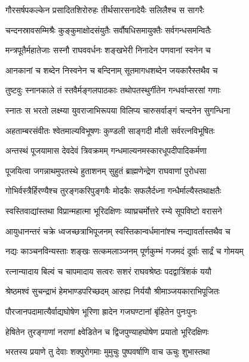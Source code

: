\twolineshloka
{गौरसर्षपकल्केन प्रसादितशिरोरुहः}
{तीर्थसारसनादेयैः सलिलैश्च स सागरैः}%

\twolineshloka
{चन्दनस्रावसम्मिश्रैः कुङ्कुमाक्षोदसंयुतैः}
{सर्वौषधिसमायुक्तैः सर्वगन्धसमन्वितैः}%

\twolineshloka
{मन्त्रपूतैर्महातेजाः सस्नौ राघववर्धनः}
{शङ्खभेरी निनादेन पणवानां स्वनेन च}%

\twolineshloka
{आनकानां च शब्देन निस्वनेन च बन्दिनाम्}
{सूतमागधशब्देन जयकारैस्तथैव च}%

\twolineshloka
{तुष्टवुः स्नानकाले तं स्तवैर्मङ्गलपाठकाः}
{तथोपतस्थुर्गीतेन गन्धर्वाप्सरसां गणाः}%

\twolineshloka
{स्नातः स भरतो लक्ष्म्या युवराजाभिरूपया}
{विलिप्य चारुसर्वाङ्गं चन्दनेन सुगन्धिना}%

\twolineshloka
{अहताम्बरसंवीतः श्वेतमाल्यविभूषणः}
{कुण्डली साङ्गदी मौली सर्वरत्नविभूषितः}%

\twolineshloka
{अन्तस्थं पूजयामास देवदेवं त्रिवक्रमम्}
{गन्धमाल्यनमस्कारधूपदीपादिकर्मणा} %

\twolineshloka
{पूजयित्वा जगन्नाथमुपतस्थे हुताशनम्}
{सुहुतं ब्राह्मणेन्द्रेण राघवाणां पुरोधसा}%

\twolineshloka
{गोभिर्वस्त्रैर्हिरण्यैश्च तुरङ्गकरिपुङ्गवैः}
{मोदकैः सफलैर्दध्ना गन्धैर्माल्यैस्तथाक्षतैः}%

\twolineshloka
{स्वस्तिवाद्यांस्तथा विप्रान्महात्मा भूरिदक्षिणः}
{व्याघ्रचर्मोत्तरे रम्ये सूपविष्टो वरासने}%

\twolineshloka
{आयुधानन्तरं चक्रे ध्वजच्छत्राभिपूजनम्}
{स्वस्तिकान्वर्धमानांश्च नन्द्यावर्तास्तथैव च}%

\twolineshloka
{नद्यः काञ्चनविन्यस्ताः शङ्खः सत्कमलाञ्जनम्}
{पूर्णकुम्भं गजमदं दूर्वाः सार्द्रं च गोमयम्}%

\twolineshloka
{रत्नान्यादाय बिल्वं च चापमादाय सत्वरः}
{सशरं राघवश्रेष्ठः पदद्वात्रिंशकं ययौ}%

\twolineshloka
{श्रेष्ठमश्वं सुचन्द्राभं हेमभाण्डपरिच्छदम्}
{आरुह्य निर्ययौ श्रीमाञ्जयकाराभिपूजितः}%

\twolineshloka
{पौरजानपदामात्यैर्वाद्यघोषेण भूरिणा}
{ह्रादेन गजघण्टानां बृंहितेन पुनःपुनः}%

\twolineshloka
{हेषितेन तुरङ्गाणां नराणां क्ष्वेडितेन च}
{द्विजपुण्याहघोषेण प्रयातो भूरिदक्षिणः}%

\twolineshloka
{भरतस्य प्रयाणे तु देवाः शक्पुरोगमाः}
{मुमुचुः पुष्पवर्षाणि वाच ऊचुः शुभास्तथा} %


